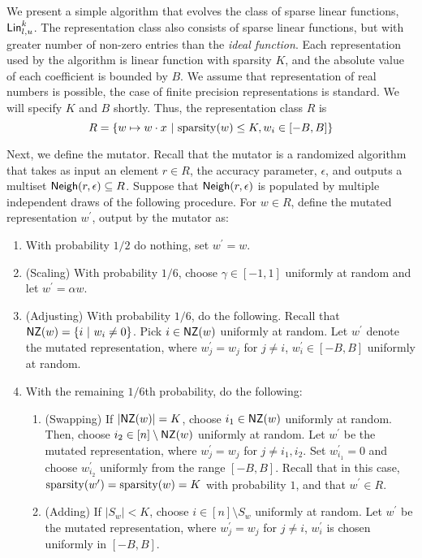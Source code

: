 
We present a simple algorithm that evolves the class of sparse linear functions,
$\mathsf{Lin}^k_{l, u}$.  The representation class also consists of sparse linear
functions, but with greater number of non-zero entries than the \emph{ideal
function}.
Each representation used by the algorithm is linear
function with sparsity $K$, and the absolute value of each coefficient is
bounded by $B$. We assume that representation of real numbers is possible, the
case of finite precision representations is standard.  We will specify $K$ and
$B$ shortly. Thus, the representation class $R$ is
\[ 
R = \{ w \mapsto w \cdot x ~|~ \mathrm{sparsity}(w) \leq K, w_i \in [-B, B] \}
\]

Next, we define the mutator. Recall that the mutator is a randomized algorithm
that takes as input an element $r \in R$, the accuracy parameter, $\epsilon$,
and outputs a multiset $\mathsf{Neigh}(r, \epsilon) \subseteq R$. Suppose that
$\mathsf{Neigh}(r, \epsilon)$ is populated by multiple independent draws of the
following procedure.  For $w \in R$, define the mutated representation
$w^\prime$, output by the mutator as:
\begin{enumerate}
%
\item With probability $1/2$ do nothing, set $w^\prime = w$.
%
\item (Scaling) With probability $1/6$, choose $\gamma \in [-1, 1]$ uniformly at
random and let $w^\prime = \alpha w$. 
%
\item (Adjusting) With probability $1/6$, do the following. Recall that $\mathsf{NZ}(w)
= \{ i~|~ w_i \neq 0 \}$. Pick $i \in \mathsf{NZ}(w)$ uniformly at random. Let
$w^\prime$ denote the mutated representation, where $w^\prime_j = w_j$ for $j
\neq i$, $w^\prime_i \in [-B, B]$ uniformly at random. 
%
\item With the remaining $1/6$th probability, do the following:
\begin{enumerate}
\item (Swapping) If $|\mathsf{NZ}(w)| = K$, choose $i_1 \in \mathsf{NZ}(w)$ uniformly at random.
Then, choose $i_2 \in [n] \setminus \mathsf{NZ}(w)$ uniformly at random. Let $w^\prime$
be the mutated representation, where $w_j^\prime = w_j$ for $j \neq i_1, i_2$.
Set $w_{i_1}^\prime = 0$ and choose $w_{i_2}^\prime$ uniformly from the range
$[-B, B]$. Recall that in this case, $\mathrm{sparsity}(w^\prime) = \mathrm{sparsity}(w) = K$
with probability $1$, and that $w^\prime \in R$.
\item (Adding) If $|S_w| < K$, choose $i \in [n] \setminus S_w$ uniformly at random. Let
$w^\prime$ be the mutated representation, where $w_j^\prime = w_j$ for $j \neq
i$, $w^\prime_i$ is chosen uniformly in $[-B, B]$. 
\end{enumerate}
\end{enumerate}

